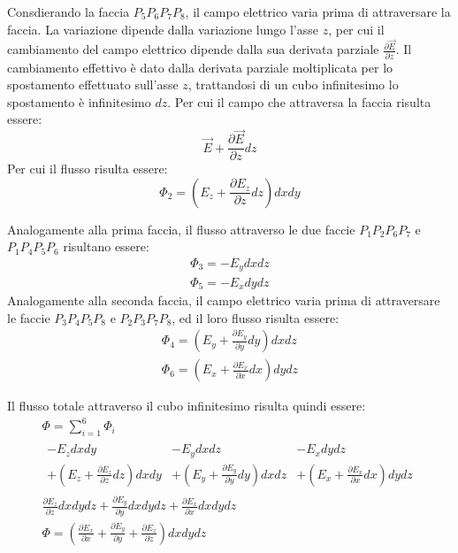 \documentclass{article}
\numberwithin{equation}{subsection}
\begin{document}
Consdierando la faccia $P_5P_6P_7P_8$, il campo elettrico varia prima di attraversare la faccia. La variazione dipende dalla variazione lungo l'asse $z$, per cui il cambiamento 
del campo elettrico dipende dalla sua derivata parziale $\displaystyle\frac{\partial\vec{E}}{\partial z}$. Il cambiamento effettivo è dato dalla derivata parziale 
moltiplicata per lo spostamento effettuato sull'asse $z$, trattandosi di un cubo infinitesimo lo spostamento è infinitesimo $dz$. Per cui il campo che attraversa la faccia 
risulta essere:
\begin{equation*}
    \vec{E}+\displaystyle\frac{\partial \vec{E}}{\partial z}dz
\end{equation*} 
Per cui il flusso risulta essere:
\begin{equation*}
    \Phi_2=\left(E_z+\displaystyle\frac{\partial E_z}{\partial z}dz\right)dxdy
\end{equation*}

Analogamente alla prima faccia, il flusso attraverso le due faccie $P_1P_2P_6P_7$ e $P_1P_4P_5P_6$ risultano essere:
\begin{gather*}
    \Phi_3=-E_ydxdz\\
    \Phi_5=-E_xdydz
\end{gather*}
Analogamente alla seconda faccia, il campo elettrico varia prima di attraversare le faccie $P_3P_4P_5P_8$ e $P_2P_3P_7P_8$, ed il loro flusso risulta essere:
\begin{gather*}
    \Phi_4=\left(E_y+\displaystyle\frac{\partial E_y}{\partial y}dy\right)dxdz\\
    \Phi_6=\left(E_x+\displaystyle\frac{\partial E_x}{\partial x}dx\right)dydz
\end{gather*}

Il flusso totale attraverso il cubo infinitesimo risulta quindi essere:
\begin{gather*}
    \Phi=\displaystyle\sum_{i=1}^6\Phi_i\\
    \begin{matrix}
        -E_zdxdy & -E_ydxdz & -E_xdydz\\
        +\left(E_z+\displaystyle\frac{\partial E_z}{\partial z}dz\right)dxdy & +\left(E_y+\displaystyle\frac{\partial E_y}{\partial y}dy\right)dxdz & +\left(E_x+\displaystyle\frac{\partial E_x}{\partial x}dx\right)dydz
    \end{matrix}\\
    \displaystyle\frac{\partial E_z}{\partial z}dxdydz+\frac{\partial E_y}{\partial y}dxdydz+\frac{\partial E_x}{\partial x}dxdydz\\
    \Phi=\left(\displaystyle\frac{\partial E_x}{\partial x}+\frac{\partial E_y}{\partial y}+\frac{\partial E_z}{\partial z}\right)dxdydz
\end{gather*}
\end{document}
